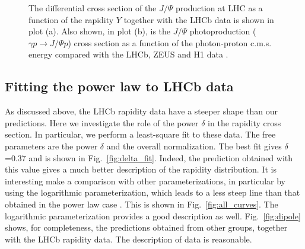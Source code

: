 \documentclass[12pt]{article}
\begin{document}
\begin{figure}[!h]
  \centering
  \caption{The differential cross section of the $J/\Psi$ production at LHC as a function of the rapidity $Y$ together with the LHCb data is shown in plot (a). Also shown, in plot (b), is the $J/\Psi$ photoproduction ($\gamma p \to J/\Psi p$) cross section as a function of the photon-proton c.m.s. energy compared
           with the LHCb, ZEUS and H1 data .}
\end{figure}

\subsection{Fitting the power law to LHCb data}

As discussed above, the LHCb rapidity data have a steeper shape than our predictions.
Here we investigate the role of the power $\delta$ in the rapidity cross section.
In particular, we perform a least-square fit to these data.
The free parameters are the power $\delta$ and the overall normalization.
The best fit gives $\delta$=0.37 and is shown in Fig.~\ref{fig:delta_fit}.
Indeed, the prediction  obtained with this value gives a much better description of the rapidity distribution.
It is interesting make a comparison with other parameterizations, in particular by using the
logarithmic parameterization, which leads to a less steep line than that obtained in the power law case .
This is shown  in Fig.~\ref{fig:all_curves}. The logarithmic parameterization provides a good description as well.
Fig.~\ref{fig:dipole} shows, for completeness, the predictions obtained from other groups, together with the LHCb rapidity data.
The description of data is reasonable.
\end{document}
